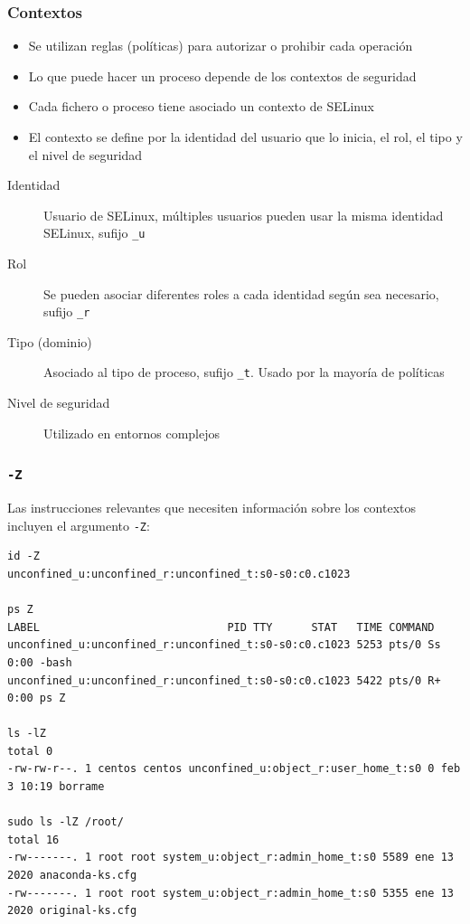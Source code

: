 \documentclass[aspectratio=169]{beamer}
\begin{document}
\begin{frame}
  \frametitle{Contextos}
  \begin{itemize}
  \item Se utilizan reglas (políticas) para autorizar o prohibir cada operación
  \item Lo que puede hacer un proceso depende de los contextos de seguridad
  \item Cada fichero o proceso tiene asociado un contexto de SELinux
  \item El contexto se define por la identidad del usuario que lo inicia, el rol, el tipo y el nivel de seguridad
  \end{itemize}
  \begin{description}
  \item[Identidad] Usuario de SELinux, múltiples usuarios pueden usar la misma identidad SELinux, sufijo \texttt{\_u}
  \item[Rol] Se pueden asociar diferentes roles a cada identidad según sea necesario, sufijo \texttt{\_r}
  \item[Tipo (dominio)] Asociado al tipo de proceso, sufijo \texttt{\_t}. Usado por la mayoría de políticas
  \item [Nivel de seguridad] Utilizado en entornos complejos
  \end{description}
\end{frame}
\begin{frame}[fragile]
  \frametitle{\texttt{-Z}}
Las instrucciones relevantes que necesiten información sobre los contextos incluyen el argumento \texttt{-Z}:
\begin{lstlisting}[basicstyle=\tiny\ttfamily]
id -Z
unconfined_u:unconfined_r:unconfined_t:s0-s0:c0.c1023

ps Z
LABEL                             PID TTY      STAT   TIME COMMAND
unconfined_u:unconfined_r:unconfined_t:s0-s0:c0.c1023 5253 pts/0 Ss   0:00 -bash
unconfined_u:unconfined_r:unconfined_t:s0-s0:c0.c1023 5422 pts/0 R+   0:00 ps Z

ls -lZ
total 0
-rw-rw-r--. 1 centos centos unconfined_u:object_r:user_home_t:s0 0 feb  3 10:19 borrame

sudo ls -lZ /root/
total 16
-rw-------. 1 root root system_u:object_r:admin_home_t:s0 5589 ene 13  2020 anaconda-ks.cfg
-rw-------. 1 root root system_u:object_r:admin_home_t:s0 5355 ene 13  2020 original-ks.cfg
\end{lstlisting}
\end{frame}
\end{document}
